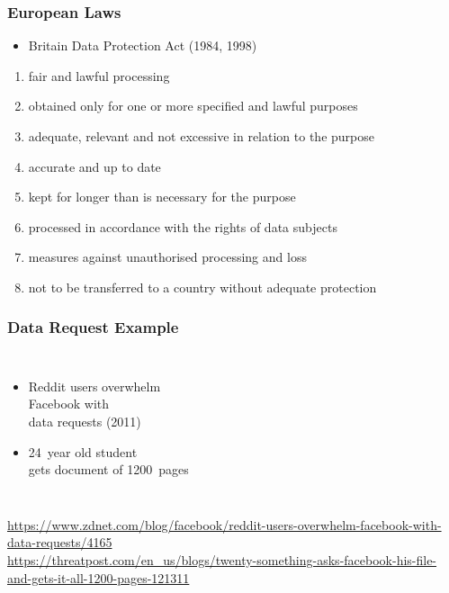 \documentclass[dvipsnames]{beamer}
\theoremstyle{plain}
\begin{document}
\begin{frame}
  \frametitle{European Laws}

  \begin{itemize}
   \item Britain Data Protection Act (1984, 1998)
  \end{itemize}

  \begin{enumerate}
    \item fair and lawful processing
    \item obtained only for one or more specified and lawful purposes
    \item adequate, relevant and not excessive in relation to the purpose
    \item accurate and up to date
    \item kept for longer than is necessary for the purpose
    \item processed in accordance with the rights of data subjects
    \item measures against unauthorised processing and loss
    \item not to be transferred to a country without adequate protection
  \end{enumerate}
\end{frame}

\begin{frame}
  \frametitle{Data Request Example}

  \begin{columns}

    \begin{itemize}
      \item Reddit users overwhelm\\
        Facebook with\\
        data requests (2011)
      \item 24~year old student\\
        gets document of 1200~pages
    \end{itemize}
  \end{columns}

  \medskip
  \tiny{\url{https://www.zdnet.com/blog/facebook/reddit-users-overwhelm-facebook-with-data-requests/4165}}\\
  \smallskip
  \tiny{\url{https://threatpost.com/en_us/blogs/twenty-something-asks-facebook-his-file-and-gets-it-all-1200-pages-121311}}\\
\end{frame}
\end{document}
